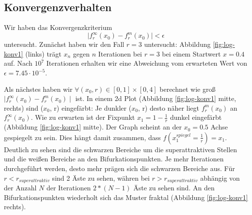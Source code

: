 \documentclass{scrartcl}
\begin{document}
\subsection{Konvergenzverhalten}
Wir haben das Konvergenzkriterium 
\begin{equation}
\mid f^{\infty}_r(x_0)-f^{m}_r(x_0)\mid < \epsilon
\end{equation}
untersucht. 
Zunächst haben wir den Fall $r=3$ untersucht: Abbildung \ref{fig:log-konv1} (links) trägt $x_n$ gegen $n$ Iterationen bei $r=3$ bei einem Startwert $x=0.4$ auf. Nach $10^7$ Iterationen erhalten wir eine Abweichung vom erwarteten Wert von $\epsilon=7.45 \cdot 10^{-5}$.


Als nächstes haben wir $\forall (x_0, r) \in [0,1] \times [0,4]$  berechnet wie groß $\mid f^{\infty}_r(x_0)-f^{m}_r(x_0)\mid $ ist. 
In einem 2d Plot (Abbildung \ref{fig:log-konv1} mitte, rechts) sind ($x_0$, r) eingefärbt: Je dunkler ($x_0$, r) desto näher liegt $f^{m}_r(x_0)$ an $f^{\infty}_r(x_0)$. 
Wie zu erwarten ist der Fixpunkt $x_1=1-\frac{1}{r}$ dunkel eingefärbt (Abbildung \ref{fig:log-konv1} mitte). Der Graph scheint an der $x_0=0.5$ Achse gespiegelt zu sein. Dies hängt damit zusammen, dass $f(x^{spiegel}_{1}=\frac{1}{r}) = x_1$. 
Deutlich zu sehen sind die schwarzen Bereiche um die superattraktiven Stellen und die weißen Bereiche an den Bifurkationspunkten. Je mehr Iterationen durchgeführt werden, desto mehr prägen sich die schwarzen Bereiche aus. Für $r < r_{superattraktiv}$ sind 2 Äste zu sehen, währen bei $r > r_{superattraktiv}$ abhängig von der Anzahl $N$ der Iterationen $2*(N-1)$ Äste zu sehen sind. An den Bifurkationspunkten wiederholt sich das Muster fraktal (Abbildung \ref{fig:log-konv1} rechts). 
\end{document}
